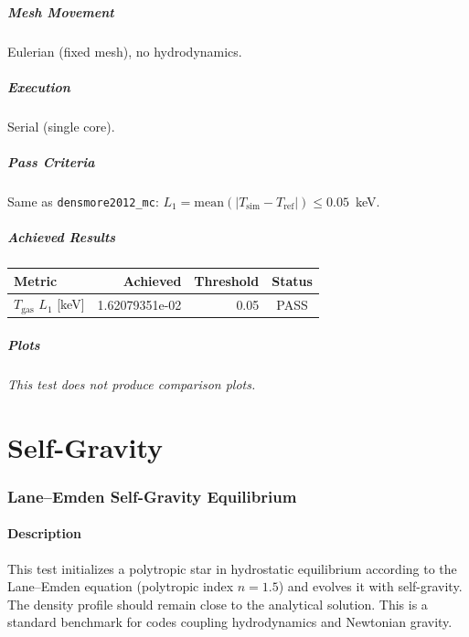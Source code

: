 \documentclass[11pt,a4paper]{article}
\begin{document}
\subsubsection*{Mesh Movement}
Eulerian (fixed mesh), no hydrodynamics.

\subsubsection*{Execution}
Serial (single core).

\subsubsection*{Pass Criteria}
Same as \texttt{densmore2012\_mc}: $L_1 = \mathrm{mean}(|T_{\mathrm{sim}} - T_{\mathrm{ref}}|) \le 0.05$~keV.

\subsubsection*{Achieved Results}
\begin{table}[htbp]
\centering
\begin{tabular}{l r r c}
\toprule
\textbf{Metric} & \textbf{Achieved} & \textbf{Threshold} & \textbf{Status} \\
\midrule
$T_{\mathrm{gas}}$ $L_1$ [keV] & 1.62079351e-02 & 0.05 & {\color{green!60!black}PASS} \\
\bottomrule
\end{tabular}
\end{table}

\subsubsection*{Plots}
\textit{This test does not produce comparison plots.}

\newpage

\part{Self-Gravity}
\setcounter{section}{0}
\newpage

\section{Lane--Emden Self-Gravity Equilibrium}
\label{sec:lane_self_gravity}

\subsection*{Description}
This test initializes a polytropic star in hydrostatic equilibrium according to the Lane--Emden equation \cite{chandrasekhar1939,lane1870} (polytropic index $n = 1.5$) and evolves it with self-gravity. The density profile should remain close to the analytical solution. This is a standard benchmark for codes coupling hydrodynamics and Newtonian gravity.
\end{document}
